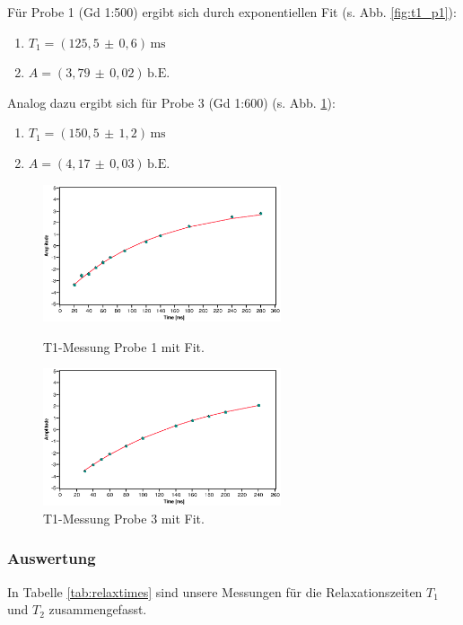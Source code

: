 \documentclass[a4paper]{scrartcl} %
\newcommand{\err}[2]{( #1 \, \pm \, #2 )} %
\newcommand{\ms}{\, \mathrm{ms}}
\newcommand{\be}{\, \mathrm{b.E.}}
\begin{document}
Für Probe 1 (Gd 1:500) ergibt sich durch exponentiellen Fit (s. Abb. \ref{fig:t1_p1}):
\begin{enumerate}
	\item[] $T_1 = \err{125,5}{0,6} \ms$
	\item[] $A = \err{3,79}{0,02} \be$
\end{enumerate}
Analog dazu ergibt sich für Probe 3 (Gd 1:600) (s. Abb. \ref{fig:t1_p3}):
\begin{enumerate}
	\item[] $T_1 = \err{150,5}{1,2} \ms$
	\item[] $A = \err{4,17}{0,03} \be$
\end{enumerate}

\begin{figure}[H]
	\centering
	\parbox{70mm}{
		\centering
		\includegraphics[width=70mm]{./Resources/t1_meas_p1.eps}
		\caption{T1-Messung Probe 1 mit Fit.}
		\label{fig:t1_p1}
	}
	\hspace*{\fill}
	\parbox{70mm}{
		\centering
		\includegraphics[width=70mm]{./Resources/t1_meas_p3.eps}
		\caption{T1-Messung Probe 3 mit Fit.}
		\label{fig:t1_p3}
	}
\end{figure}

\subsubsection{Auswertung}

In Tabelle \ref{tab:relaxtimes} sind unsere Messungen für die Relaxationszeiten $T_1$ und $T_2$ zusammengefasst.
\end{document}
